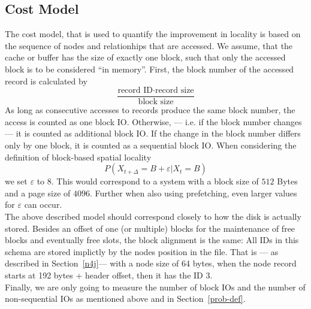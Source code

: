     \subsection*{Cost Model}
        The cost model, that is used to quantify the improvement in locality is based on the sequence of nodes and relationhips that are accessed. 
        We assume, that the cache or buffer has the size of exactly one block, such that only the accessed block is to be considered ``in memory''.
        First, the block number of the accessed record is calculated by 
        \[ \frac{\text{record ID} \cdot \text{record size}}{\text{block size}} \]
        As long as consecutive accesses to records produce the same block number, the access is counted as one block IO.
        Otherwise, --- i.e. if the block number changes --- it is counted as additional block IO. 
        If the change in the block number differs only by one block, it is counted as a sequential block IO.
        When considering the definition of block-based spatial locality
        \[ P(X_{t + \Delta} = B + \varepsilon | X_t = B) \]
        we set $\varepsilon$ to 8. 
        This would correspond to a system with a block size of $512$ Bytes and a page size of $4096$.
        Further when also using prefetching, even larger values for $\varepsilon$ can occur.  \\
        The above described model should correspond closely to how the disk is actually stored. 
        Besides an offset of one (or multiple) blocks for the maintenance of free blocks and eventually free slots, the block alignment is the same:
        All IDs in this schema are stored implictly by the nodes position in the file. 
        That is --- as described in Section~\ref{n4j}--- with a node size of 64 bytes, when the node record starts at 192 bytes + header offset, then it has the ID $3$. \\
        Finally, we are only going to measure the number of block IOs and the number of non-sequential IOs as mentioned above and in Section~\ref{prob-def}.
    
